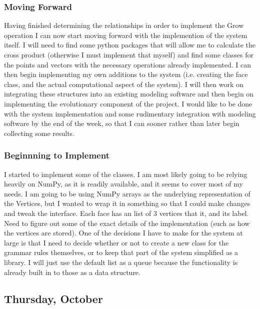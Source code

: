 \documentclass[letterpaper,oneside,titlepage]{article}
\begin{document}
\subsubsection{Moving Forward}
Having finished determining the relationships in order to implement the Grow operation I can now start moving forward with the implemention of the system itself.  I will need to find some python packages that will allow me to calculate the cross product (otherwise I must implement that myself) and find some classes for the points and vectors with the necessary operations already implemented.  I can then begin implementing my own additions to the system (i.e. creating the face class, and the actual computational aspect of the system).  I will then work on integrating these structures into an existing modeling software and then begin on implementing the evolutionary component of the project.  I would like to be done with the system implementation and some rudimentary integration with modeling software by the end of the week, so that I can sooner rather than later begin collecting some results.
\subsubsection{Beginnning to Implement}
I started to implement some of the classes.  I am most likely going to be relying heavily on NumPy, as it is readily available, and it seems to cover most of my needs.  I am going to be using NumPy arrays as the underlying representation of the Vertices, but I wanted to wrap it in something so that I could make changes and tweak the interface.  Each face has an list of 3 vertices that it, and its label.  Need to figure out some of the exact details of the implementation (such as how the vertices are stored).  One of the decisions I have to make for the system at large is that I need to decide whether or not to create a new class for the grammar rules themselves, or to keep that part of the system simplified as a library.  I will just use the default list as a queue because the functionality is already built in to those as a data structure.

\subsection{Thursday, October }
\end{document}

